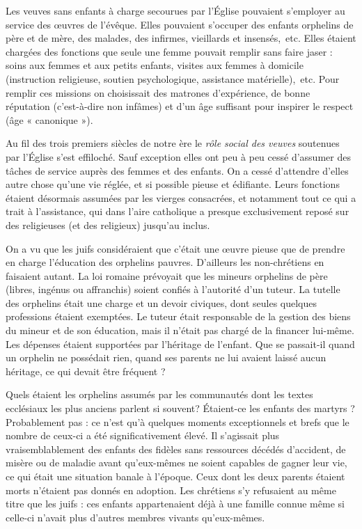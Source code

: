  Les veuves sans enfants à charge secourues par l'Église pouvaient s'employer au service des œuvres de l'évêque. Elles pouvaient s'occuper des enfants orphelins de père et de mère, des malades, des infirmes, vieillards et insensés,~etc. Elles étaient chargées des fonctions que seule une femme pouvait remplir sans faire jaser : soins aux femmes et aux petits enfants, visites aux femmes à domicile (instruction religieuse, soutien psychologique, assistance matérielle),~etc. Pour remplir ces missions on choisissait des matrones d'expérience, de bonne réputation (c'est-à-dire non infâmes) et d'un âge suffisant pour inspirer le respect (âge « canonique »). 

 Au fil des trois premiers siècles de notre ère le \emph{rôle social des veuves} soutenues par l'Église s'est effiloché. Sauf exception elles ont peu à peu cessé d'assumer des tâches de service auprès des femmes et des enfants. On a cessé d'attendre d'elles autre chose qu'une vie réglée, et si possible pieuse et édifiante. Leurs fonctions étaient désormais assumées par les vierges consacrées, et notamment tout ce qui a trait à l'assistance, qui dans l'aire catholique a presque exclusivement reposé sur des religieuses (et des religieux) jusqu'au  inclus. 



On a vu que les juifs considéraient que c'était une œuvre pieuse que de prendre en charge l'éducation des orphelins pauvres. D'ailleurs les non-chrétiens en faisaient autant. La loi romaine prévoyait que les mineurs orphelins de père (libres, ingénus ou affranchis) soient confiés à l'autorité d'un tuteur. La tutelle des orphelins était une charge et un devoir civiques, dont seules quelques professions étaient exemptées. Le tuteur était responsable de la gestion des biens du mineur et de son éducation, mais il n'était pas chargé de la financer lui-même. Les dépenses étaient supportées par l'héritage de l'enfant. Que se passait-il quand un orphelin ne possédait rien, quand ses parents ne lui avaient laissé aucun héritage, ce qui devait être fréquent ? 

 Quels étaient les orphelins assumés par les communautés dont les textes ecclésiaux les plus anciens parlent si souvent? Étaient-ce les enfants des martyrs ? Probablement pas : ce n'est qu'à quelques moments exceptionnels et brefs que le nombre de ceux-ci a été significativement élevé. Il s'agissait plus vraisemblablement des enfants des fidèles sans ressources décédés d'accident, de misère ou de maladie avant qu'eux-mêmes ne soient capables de gagner leur vie, ce qui était une situation banale à l'époque. Ceux dont les deux parents étaient morts n'étaient pas donnés en adoption. Les chrétiens s'y refusaient au même titre que les juifs : ces enfants appartenaient déjà à une famille connue même si celle-ci n'avait plus d'autres membres vivants qu'eux-mêmes. 

